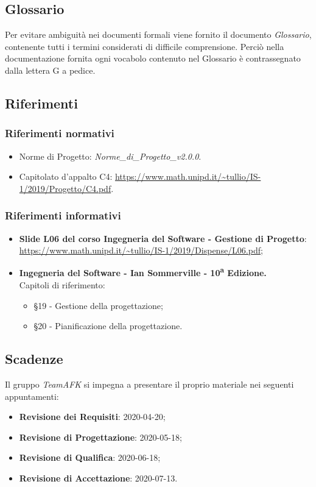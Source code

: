 \subsection{Glossario}
Per evitare ambiguità nei documenti formali viene fornito il documento \textit{Glossario}, contenente tutti i termini considerati di difficile comprensione. Perciò nella documentazione fornita ogni vocabolo contenuto nel Glossario è contrassegnato dalla lettera G a pedice.

\subsection{Riferimenti}
\subsubsection{Riferimenti normativi}
\begin{itemize}
	\item Norme di Progetto: \textit{Norme\_di\_Progetto\_v2.0.0}.
	\item Capitolato d'appalto C4: \url{https://www.math.unipd.it/~tullio/IS-1/2019/Progetto/C4.pdf}.
\end{itemize}
\subsubsection{Riferimenti informativi}
\begin{itemize}
	\item \textbf{Slide L06 del corso Ingegneria del Software - Gestione di Progetto}: \\
	\url{https://www.math.unipd.it/~tullio/IS-1/2019/Dispense/L06.pdf};
	\item \textbf{Ingegneria del Software - Ian Sommerville - 10\textsuperscript{a} Edizione.}\\
	Capitoli di riferimento: \begin{itemize}
	\item \S 19 - Gestione della progettazione;
	\item \S 20 - Pianificazione della progettazione.
	\end{itemize}
\end{itemize}
\subsection{Scadenze}
Il gruppo \textit{TeamAFK} si impegna a presentare il proprio materiale nei seguenti appuntamenti:\\
\begin{itemize}
\item \textbf{Revisione dei Requisiti}: 2020-04-20;
\item \textbf{Revisione di Progettazione}: 2020-05-18;
\item \textbf{Revisione di Qualifica}: 2020-06-18;
\item \textbf{Revisione di Accettazione}: 2020-07-13. 
\end{itemize}
